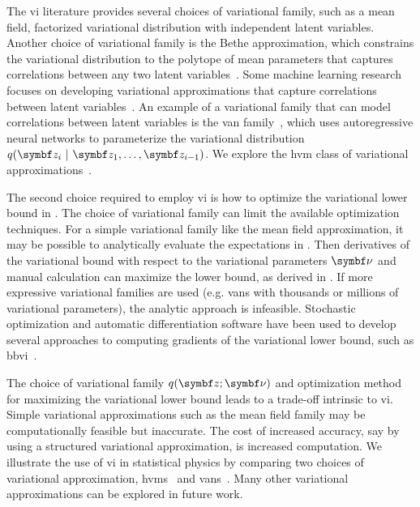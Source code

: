 The \gls{vi} literature provides several choices of variational family, such as a mean field, factorized variational distribution with independent latent variables. Another choice of variational family is the Bethe approximation, which constrains the variational distribution to the polytope of mean parameters that captures correlations between any two latent variables~\citep{wainwright2008graphical}. Some machine learning research focuses on developing variational approximations that capture correlations between latent variables~\citep{hoffman2015stochastic,kingma2016improved,maaloe2016auxiliary,wu2019solving}. An example of a variational family that can model correlations between latent variables is the \gls{van} family~\citep{wu2019solving}, which uses autoregressive neural networks to parameterize the variational distribution ${q(\mbz_i \mid \mbz_1, \ldots, \mbz_{i-1})}$. We explore the \gls{hvm} class of variational approximations~\citep{ranganath2018black}.

The second choice required to employ \gls{vi} is how to optimize the variational lower bound in . The choice of variational family can limit the available optimization techniques. For a simple variational family like the mean field approximation, it may be possible to analytically evaluate the expectations in . Then derivatives of the variational bound with respect to the variational parameters $\mbnu$ and manual calculation can maximize the lower bound, as derived in . If more expressive variational families are used (e.g. \gls{van}s with thousands or millions of variational parameters), the analytic approach is infeasible. Stochastic optimization and automatic differentiation software have been used to develop several approaches to computing gradients of the variational lower bound, such as \acrlong{bbvi}~\citep{ranganath2018black,mohamed2019monte}.


The choice of variational family $q(\mbz; \mbnu)$ and optimization method for maximizing the variational lower bound leads to a trade-off intrinsic to \gls{vi}. Simple variational approximations such as the mean field family may be computationally feasible but inaccurate. The cost of increased accuracy, say by using a structured variational approximation, is increased computation. We illustrate the use of \gls{vi} in statistical physics by comparing two choices of variational approximation, \glspl{hvm}~\citep{ranganath2018black} and \glspl{van}~\citep{wu2019solving}. Many other variational approximations can be explored in future work.
